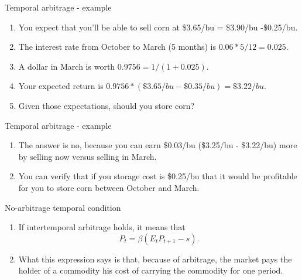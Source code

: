 \documentclass[table,xcolor=pdftex,dvipsnames, handout]{beamer}\usepackage[]{graphicx}\usepackage[]{color}
\begin{document}

\begin{frame}{Temporal arbitrage - example}
\begin{enumerate}[label=\textbullet]
    \item You expect that you'll be able to sell corn at \$3.65/bu = \$3.90/bu -\$0.25/bu.
    \item The interest rate from October to March (5 months) is $0.06*5/12 = 0.025$.
    \item A dollar in March is worth $0.9756 = 1/(1+0.025)$.
    \item Your expected return is $0.9756 *(\$3.65/bu - \$0.35/bu)= \$3.22/bu$.
    \item Given those expectations, should you store corn?
\end{enumerate}
\end{frame}


\begin{frame}{Temporal arbitrage - example}
\begin{enumerate}[label=\textbullet]
    \item The answer is no, because you can earn \$0.03/bu (\$3.25/bu - \$3.22/bu) more by selling now versus selling in March.
    \item You can verify that if you storage cost is \$0.25/bu that it would be profitable for you to store corn between October and March.
\end{enumerate}
\end{frame}


\begin{frame}{No-arbitrage temporal condition}
\begin{enumerate}[label=\textbullet]
    \item If intertemporal arbitrage holds, it means that \[  P_t = \beta (E_t P_{t+1} - s). \]
    \vspace{-1\baselineskip}
    \item What this expression says is that, because of arbitrage, the market pays the holder of a commodity his cost of carrying the commodity for one period.
\end{enumerate}
\end{frame}
\end{document}
